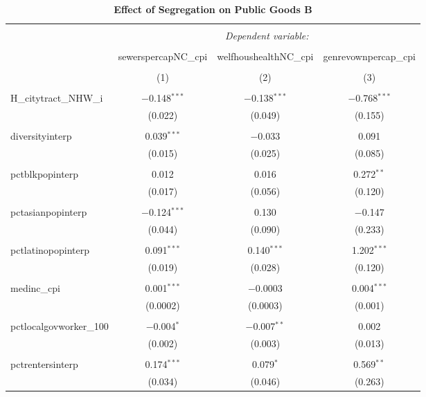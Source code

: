 \documentclass[]{article}
\begin{document}
\begin{table}[!htbp] \centering 
  \caption{\textbf{Effect of Segregation on Public Goods B}} 
  \label{} 
\begin{tabular}{@{\extracolsep{5pt}}lccc} 
\\[-1.8ex]\hline 
\hline \\[-1.8ex] 
 & \multicolumn{3}{c}{\textit{Dependent variable:}} \\ 
\cline{2-4} 
\\[-1.8ex] & sewerspercapNC\_cpi & welfhoushealthNC\_cpi & genrevownpercap\_cpi \\ 
\\[-1.8ex] & (1) & (2) & (3)\\ 
\hline \\[-1.8ex] 
 H\_citytract\_NHW\_i & $-$0.148$^{***}$ & $-$0.138$^{***}$ & $-$0.768$^{***}$ \\ 
  & (0.022) & (0.049) & (0.155) \\ 
  & & & \\ 
 diversityinterp & 0.039$^{***}$ & $-$0.033 & 0.091 \\ 
  & (0.015) & (0.025) & (0.085) \\ 
  & & & \\ 
 pctblkpopinterp & 0.012 & 0.016 & 0.272$^{**}$ \\ 
  & (0.017) & (0.056) & (0.120) \\ 
  & & & \\ 
 pctasianpopinterp & $-$0.124$^{***}$ & 0.130 & $-$0.147 \\ 
  & (0.044) & (0.090) & (0.233) \\ 
  & & & \\ 
 pctlatinopopinterp & 0.091$^{***}$ & 0.140$^{***}$ & 1.202$^{***}$ \\ 
  & (0.019) & (0.028) & (0.120) \\ 
  & & & \\ 
 medinc\_cpi & 0.001$^{***}$ & $-$0.0003 & 0.004$^{***}$ \\ 
  & (0.0002) & (0.0003) & (0.001) \\ 
  & & & \\ 
 pctlocalgovworker\_100 & $-$0.004$^{*}$ & $-$0.007$^{**}$ & 0.002 \\ 
  & (0.002) & (0.003) & (0.013) \\ 
  & & & \\ 
 pctrentersinterp & 0.174$^{***}$ & 0.079$^{*}$ & 0.569$^{**}$ \\ 
  & (0.034) & (0.046) & (0.263) \\ 

\end{tabular}
\end{table}
\end{document}
